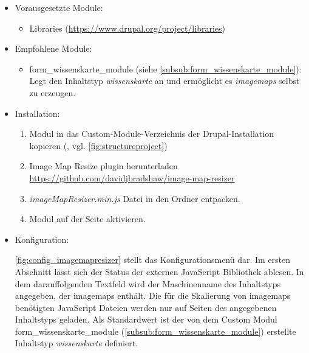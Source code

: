 \begin{itemize}[parsep=0pt, itemsep=5.0pt plus 2.0pt minus 1.0pt, leftmargin=*]
	\item Vorausgesetzte Module:

	\begin{itemize}
		\item Libraries (\url{https://www.drupal.org/project/libraries})
	\end{itemize}


	\item Empfohlene Module:

	\begin{itemize}
		\item form\_wissenskarte\_module (siehe \cref{subsub:form_wissenskarte_module}): Legt den Inhaltstyp \textit{wissenskarte} an und ermöglicht es \textit{\glspl{imagemap}} selbst zu erzeugen.
	\end{itemize}

	\item Installation:
	\begin{enumerate}
		\item Modul in das Custom-Module-Verzeichnis der Drupal-Installation kopieren  (\zB {}, vgl. \cref{fig:structureproject})
		\item Image Map Resize plugin herunterladen \url{https://github.com/davidjbradshaw/image-map-resizer}
		\item \textit{imageMapResizer.min.js} Datei in den Ordner  entpacken.
		\item Modul auf der Seite  aktivieren.
	\end{enumerate}


	\item Konfiguration:

	\cref{fig:config_imagemapresizer} stellt das Konfigurationsmenü dar. Im ersten Abschnitt lässt sich der Status der externen JavaScript Bibliothek ablesen. In dem darauffolgenden Textfeld wird der Maschinenname des Inhaltstyps angegeben, der \glspl{imagemap} enthält. Die für die Skalierung von \glspl{imagemap} benötigten JavaScript Dateien werden nur auf Seiten des angegebenen Inhaltstyps geladen. Als Standardwert ist der von dem Custom Modul form\_wissenskarte\_module (\cref{subsub:form_wissenskarte_module}) erstellte Inhaltstyp \textit{wissenskarte} definiert.

\end{itemize}



